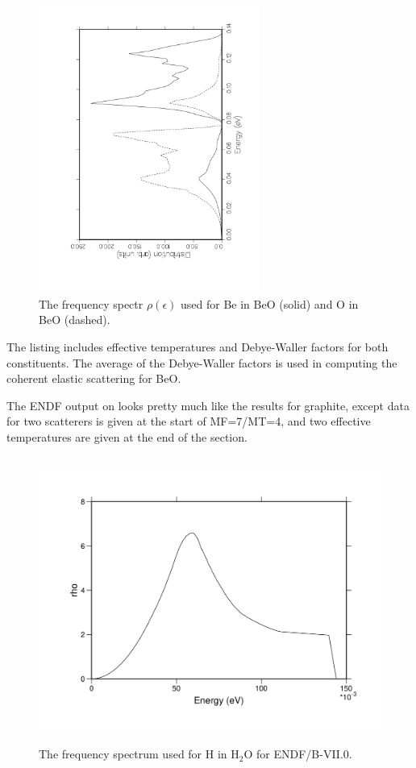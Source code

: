 \begin{figure}[b]\centering
\includegraphics[keepaspectratio, height=3.7in, angle=270]{figs/leback}
\caption[Frequency spectra for BeO]{The frequency spectr
 $\rho(\epsilon)$ used for Be in BeO (solid) and O in BeO (dashed).}
\label{beo}
\end{figure}

The listing includes effective temperatures and Debye-Waller factors
for both constituents.  The average of the Debye-Waller factors is used
in computing the coherent elastic scattering for BeO.

The ENDF output on  looks pretty much like the results for
graphite, except data for two scatterers is given at the start of MF=7/MT=4,
and two effective temperatures are given at the end of the section.

\begin{figure}[t]\centering
\includegraphics[keepaspectratio, height=3.7in, angle=0]{figs/hh2o-rhoack}
\caption[The frequency spectrum for H in H$_2$2O]{The frequency spectrum
 used for H in H$_2$O for ENDF/B-VII.0.}
\label{hh2o-rho}
\end{figure}


